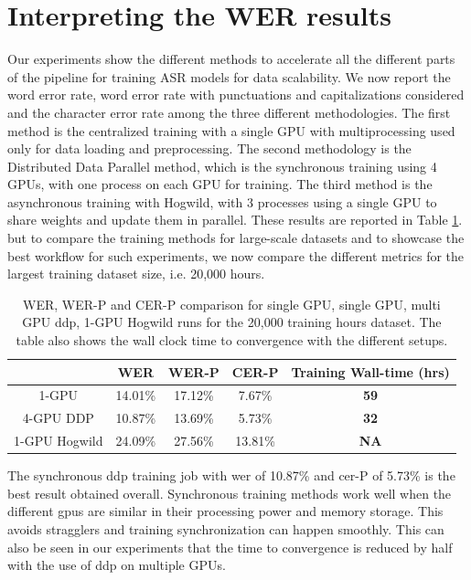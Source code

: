\section{Interpreting the WER results}
Our experiments show the different methods to accelerate all the different parts of the pipeline for training ASR models for data scalability. We now report the word error rate, word error rate with punctuations and capitalizations considered and the character error rate among the three different methodologies. The first method is the centralized training with a single GPU with multiprocessing used only for data loading and preprocessing. The second methodology is the Distributed Data Parallel method, which is the synchronous training using 4 GPUs, with one process on each GPU for training. The third method is the asynchronous training with Hogwild, with 3 processes using a single GPU to share weights and update them in parallel. These results are reported in Table \ref{table:overall_wer}. but to compare the training methods for large-scale datasets and to showcase the best workflow for such experiments, we now compare the different metrics for the largest training dataset size, i.e. 20,000 hours. 
\begin{table}[ht]
\centering
\begin{tabular}{c | c c c | c }
\hline
     & WER & WER-P & CER-P & Training Wall-time (hrs)\\
 \hline
  1-GPU & 14.01\% & 17.12\% & 7.67\% & \textbf{59} \\
  4-GPU DDP & 10.87\% & 13.69\% & 5.73\% & \textbf{32} \\
  1-GPU Hogwild & 24.09\% & 27.56\% & 13.81\% & \textbf{NA} \\
 \hline
\end{tabular}
\caption{\label{table:overall_wer} WER, WER-P and CER-P comparison for single GPU, single GPU, multi GPU \acrshort{ddp}, 1-GPU Hogwild runs for the 20,000 training hours dataset. The table also shows the wall clock time to convergence with the different setups.}
\end{table}

The synchronous \acrshort{ddp} training job with \acrshort{wer} of 10.87\% and \acrshort{cer}-P of 5.73\% is the best result obtained overall. Synchronous training methods work well when the different \acrshort{gpu}s are similar in their processing power and memory storage. This avoids stragglers and training synchronization can happen smoothly. This can also be seen in our experiments that the time to convergence is reduced by half with the use of \acrshort{ddp} on multiple GPUs. 

